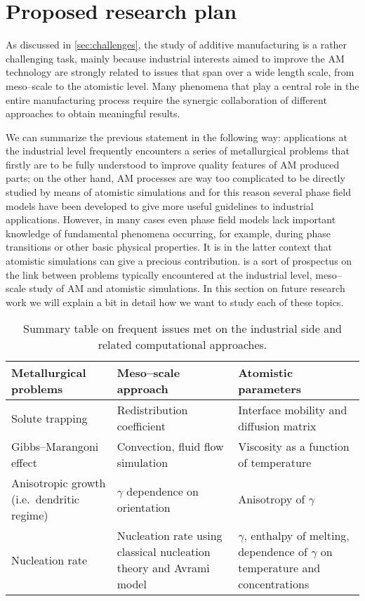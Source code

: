 \chapter{Proposed research plan}
As discussed in \cref{sec:challenges}, the study of additive manufacturing is a rather challenging task, mainly because industrial interests aimed to improve the AM technology are strongly related to issues that span over a wide length scale, from meso--scale to the atomistic level. Many phenomena that play a central role in the entire manufacturing process require the synergic collaboration of different approaches to obtain meaningful results.

We can summarize the previous statement in the following way: applications at the industrial level frequently encounters a series of metallurgical problems that firstly are to be fully understood to improve quality features of AM produced parts; on the other hand, AM processes are way too complicated to be directly studied by means of atomistic simulations and for this reason several phase field models have been developed to give more useful guidelines to industrial applications. However, in many cases even phase field models lack important knowledge of fundamental phenomena occurring, for example, during phase transitions or other basic physical properties. It is in the latter context that atomistic simulations can give a precious contribution.  is a sort of prospectus on the link between problems typically encountered at the industrial level, meso--scale study of AM and atomistic simulations. In this section on future research work we will explain a bit in detail how we want to study each of these topics.

\begin{table}[tb]
\centering
\caption{Summary table on frequent issues met on the industrial side and related computational approaches.}
\label{tab:modeling_roadmap}
\begin{tabularx}{\textwidth}{*{3}{X}}
\toprule
    \textbf{Metallurgical problems} & \textbf{Meso--scale approach} & \textbf{Atomistic parameters} \\
    \midrule
    Solute trapping & Redistribution coefficient & Interface mobility and diffusion matrix \\
    Gibbs--Marangoni effect & Convection, fluid flow simulation & Viscosity as a function of temperature\\
    Anisotropic growth (i.e.\ dendritic regime) & $\gamma$ dependence on orientation & Anisotropy of $\gamma$ \\
    Nucleation rate & Nucleation rate using classical nucleation theory and Avrami model & $\gamma$, enthalpy of melting, dependence of $\gamma$ on temperature and concentrations\\
    \bottomrule 
\end{tabularx}
\end{table}

